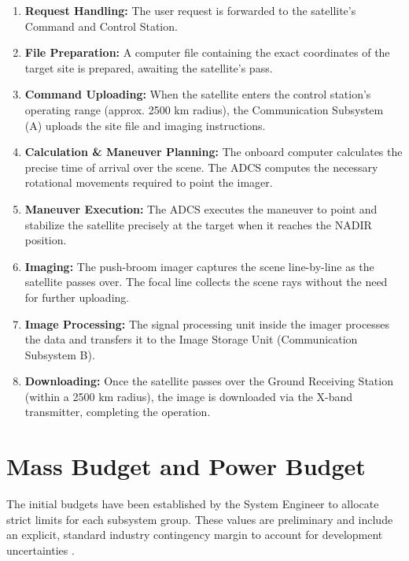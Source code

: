 ﻿\documentclass[12pt,a4paper]{report}
\begin{document}
\begin{enumerate}
    \item \textbf{Request Handling:} The user request is forwarded to the satellite's Command and Control Station.
    \item \textbf{File Preparation:} A computer file containing the exact coordinates of the target site is prepared, awaiting the satellite's pass.
    \item \textbf{Command Uploading:} When the satellite enters the control station's operating range (approx. 2500 km radius), the Communication Subsystem (A) uploads the site file and imaging instructions.
    \item \textbf{Calculation \& Maneuver Planning:} The onboard computer calculates the precise time of arrival over the scene. The ADCS computes the necessary rotational movements required to point the imager.
    \item \textbf{Maneuver Execution:} The ADCS executes the maneuver to point and stabilize the satellite precisely at the target when it reaches the NADIR position.
    \item \textbf{Imaging:} The push-broom imager captures the scene line-by-line as the satellite passes over. The focal line collects the scene rays without the need for further uploading.
    \item \textbf{Image Processing:} The signal processing unit inside the imager processes the data and transfers it to the Image Storage Unit (Communication Subsystem B).
    \item \textbf{Downloading:} Once the satellite passes over the Ground Receiving Station (within a 2500 km radius), the image is downloaded via the X-band transmitter, completing the operation.
\end{enumerate}
\section{Mass Budget and Power Budget}
The initial budgets have been established by the System Engineer to allocate strict limits for each subsystem group. These values are preliminary and include an explicit, standard industry contingency margin to account for development uncertainties \cite{smad3}.
\end{document}
